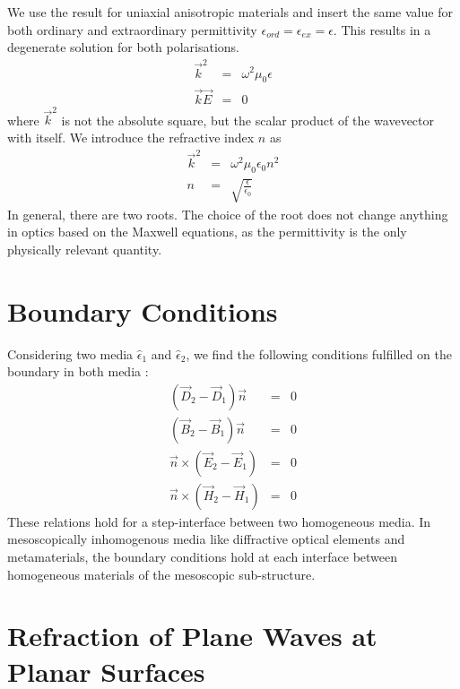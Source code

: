 \documentclass[12pt,a4paper,twoside,openright,BCOR10mm,headsepline,titlepage,abstracton,chapterprefix,final]{scrreprt}
\newcommand\vacuum{0}
\newcommand\wavenumber{k}
\newcommand\Wavevector{\Vector{\wavenumber}}
\newcommand\Vector[1]{\vec{#1}}
\newcommand\Tensor[1]{\hat{#1}}
\newcommand\scalarEfield{E}
\newcommand\scalarBfield{B}
\newcommand\scalarHfield{H}
\newcommand\scalarDfield{D}
\newcommand\Efield{\Vector{\scalarEfield}}
\newcommand\Bfield{\Vector{\scalarBfield}}
\newcommand\Hfield{\Vector{\scalarHfield}}
\newcommand\Dfield{\Vector{\scalarDfield}}
\newcommand\vacuumpermeability{\mu_{\vacuum}}
\newcommand\permittivity{\Tensor{\epsilon}}
\newcommand\vacuumpermittivity{\epsilon_{\vacuum}}
\newcommand\scalarpermittivity{\epsilon}
\begin{document}
We use the result for uniaxial anisotropic materials and insert the same value for both ordinary and extraordinary permittivity $\scalarpermittivity_{ord} = \scalarpermittivity_{ex} = \scalarpermittivity$.
This results in a degenerate solution for both polarisations.
\begin{eqnarray}
 \Wavevector^2 &=& \omega^2 \vacuumpermeability \scalarpermittivity \\
 \Wavevector \Efield &=& 0
\end{eqnarray}
where $\Wavevector^2$ is not the absolute square, but the scalar product of the wavevector with itself.
We introduce the refractive index $n$ as
\begin{eqnarray}
 \Wavevector^2 &=& \omega^2 \vacuumpermeability \vacuumpermittivity n^2 \\
 n &=& \sqrt{ \frac{\scalarpermittivity}{\vacuumpermittivity} }
\end{eqnarray}
In general, there are two roots. 
The choice of the root does not change anything in optics based on the Maxwell equations, as the permittivity is the only physically relevant quantity.


\section{Boundary Conditions}
Considering two media $\permittivity_1$ and $\permittivity_2$, we find the following conditions fulfilled on the boundary in both media \cite{Jackson}:
\begin{subequations}
\begin{eqnarray}
 ( \Dfield_2 - \Dfield_1 ) \vec{n} &=& 0 \\
 ( \Bfield_2 - \Bfield_1 ) \vec{n} &=& 0 \\
 \vec{n} \times ( \Efield_2 - \Efield_1 ) &=& 0 \\
 \vec{n} \times ( \Hfield_2 - \Hfield_1 ) &=& 0 
\end{eqnarray}
\label{eq:boundary_conditions} 
\end{subequations}
These relations hold for a step-interface between two homogeneous media. 
In mesoscopically inhomogenous media like  diffractive optical elements and metamaterials, 
the boundary conditions hold at each interface between homogeneous materials of the mesoscopic sub-structure.


\section{Refraction of Plane Waves at Planar Surfaces}
\end{document}
